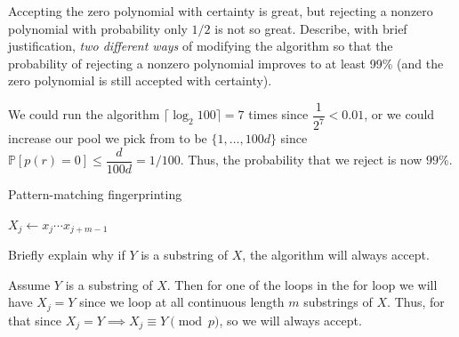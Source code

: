 \documentclass[12pt, letterpaper]{article}
\renewcommand{\P}{\mathbb{P}}
\begin{document}
\begin{subproblem}{}
    Accepting the zero polynomial with certainty is great, but rejecting a nonzero polynomial with probability only $1/2$ is not so great.
    Describe, with brief justification, \emph{two different ways} of modifying the algorithm so that the probability of rejecting a nonzero polynomial improves to at least 99\% (and the zero polynomial is still accepted with certainty).
\end{subproblem}
\begin{problemproof}
    We could run the algorithm $\lceil \log_2 100 \rceil=7$ times since $\dfrac{1}{2^7} < 0.01$, or we could increase our pool we pick from to be $\{1,\dots,100d\}$ since $\P[p(r)=0] \leq \dfrac{d}{100d} = 1/100$. Thus, the probability that we reject is now $99\%$.
\end{problemproof}

\begin{problem}{Pattern-matching fingerprinting}
    \vspace{-15pt}
    \begin{minipage}{\linewidth}
        \begin{algorithm}[H]
          \begin{algorithmic}[1]
                      \State $X_j \gets x_j \cdots x_{j+m-1}$ 
                      \EndIf
                  \EndFor
            \EndFunction
          \end{algorithmic}
        \end{algorithm}
      \end{minipage}
\end{problem}

\begin{subproblem}{}
    Briefly explain why if $Y$ is a substring of $X$, the algorithm will always accept. 
\end{subproblem}
\begin{problemproof}
    Assume $Y$ is a substring of $X$. Then for one of the loops in the for loop we will have $X_j=Y$ since we loop at all continuous length $m$ substrings of $X$. Thus, for that since $X_j=Y \implies X_j \equiv Y \pmod{p}$, so we will always accept.
\end{problemproof}
\end{document}
